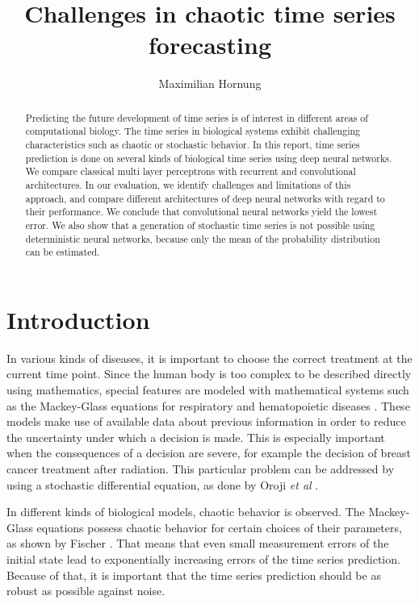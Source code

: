 \documentclass{article}
\title{Challenges in chaotic time series forecasting}
\author{Maximilian Hornung}
\begin{document}
\maketitle

\begin{abstract}
    Predicting the future development of time series is of interest in different
    areas of computational biology. The time series in biological systems exhibit
    challenging characteristics such as chaotic or stochastic behavior. In this
    report, time series prediction is done on several kinds of biological time
    series using deep neural networks. We compare classical multi layer
    perceptrons with recurrent and convolutional architectures.
    In our evaluation, we identify challenges
    and limitations of this approach, and compare different architectures of
    deep neural networks with regard to their performance. We conclude that
    convolutional neural networks yield the lowest error. We also show 
    that a generation of stochastic time series is not possible using
    deterministic neural networks, because only the mean of the probability
    distribution can be estimated.
\end{abstract}

\section{Introduction}

In various kinds of diseases, it is important to choose the correct treatment at
the current time point. Since the human body is too complex to be described
directly using mathematics, special features are modeled with mathematical
systems such as the Mackey-Glass equations for respiratory and hematopoietic
diseases \cite{mackey1977}. These models make use of available data about
previous information in order to reduce the uncertainty under which a decision
is made. This is especially important when the consequences of a decision are
severe, for example the decision of breast cancer treatment after radiation.
This particular problem can be addressed by using a stochastic differential
equation, as done by Oroji \textit{et al} \cite{oroji2016}.

In different kinds of biological models, chaotic behavior is observed. The
Mackey-Glass equations possess chaotic behavior for certain choices of their
parameters, as shown by Fischer \cite{farmer1982}. That means that even small
measurement errors of the initial state lead to exponentially increasing
errors of the time series prediction. Because of that, it is important
that the time series prediction should be as robust as possible against noise.
\end{document}
